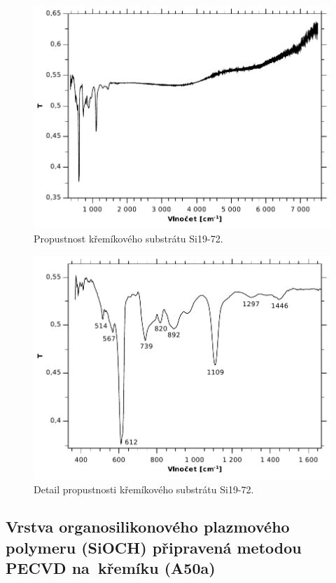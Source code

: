 \documentclass[12pt]{article}
\begin{document}
\begin{figure}
  \centering
  \includegraphics[width=135mm]{img/Si-T.pdf}
  \caption{Propustnost křemíkového substrátu Si19-72.}
  \label{SiT}
\end{figure}

\begin{figure}
  \centering
  \includegraphics[width=135mm]{img/Si-T2.pdf}
  \caption{Detail propustnosti křemíkového substrátu Si19-72.}
  \label{SiT2}
\end{figure}







\subsection{Vrstva organosilikonového plazmového polymeru (SiOCH) připravená metodou PECVD na~křemíku (A50a) }
\end{document}
